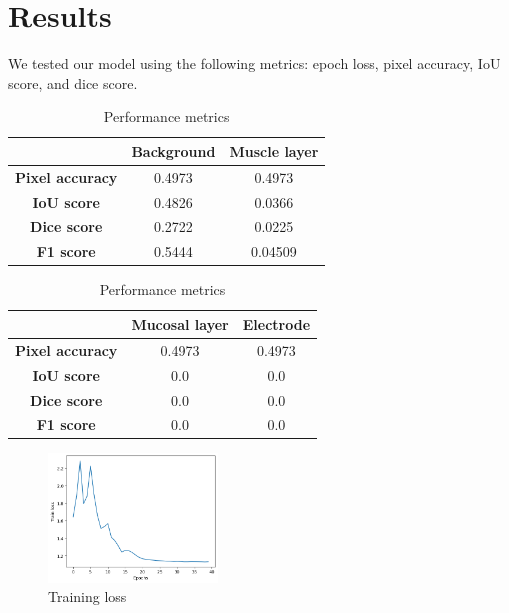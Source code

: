 \section{Results}
\label{sec:results}

We tested our model using the following metrics: epoch loss, pixel accuracy, IoU score, and dice score.

\begin{table}[htbp]
    \centering
    \caption{Performance metrics}
    \label{tab:example}

    \begin{tabular}{|c|c|c|}
        \hline
        \textbf{} & \textbf{Background} & \textbf{Muscle layer} \\
        \hline
        \textbf{Pixel accuracy} & 0.4973 & 0.4973 \\
        \textbf{IoU score} & 0.4826 & 0.0366 \\
        \textbf{Dice score} & 0.2722 & 0.0225 \\
        \textbf{F1 score} & 0.5444 & 0.04509 \\
        \hline
    \end{tabular}

    \begin{tabular}{|c|c|c|}
        \hline
        \textbf{} & \textbf{Mucosal layer} & \textbf{Electrode} \\
        \hline
        \textbf{Pixel accuracy} & 0.4973 & 0.4973 \\
        \textbf{IoU score} & 0.0 & 0.0 \\
        \textbf{Dice score} & 0.0 & 0.0 \\
        \textbf{F1 score} & 0.0 & 0.0 \\
        \hline
    \end{tabular}

\end{table}

\begin{figure}[htp!]
    \centering
    \includegraphics[width=0.4\textwidth]{Images/loss.png}
    \caption{Training loss}
    \label{fig:loss}
\end{figure}

